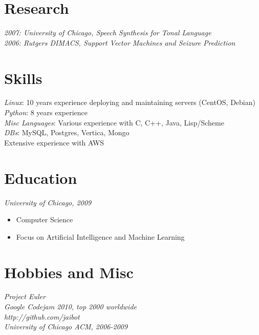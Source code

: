 \documentclass[11pt]{res} %
\begin{document}
\begin{resume}
\section{Research}
{\sl 2007: University of Chicago, Speech Synthesis for Tonal Language} \\
{\sl 2006: Rutgers DIMACS, Support Vector Machines and Seizure Prediction}

\section{Skills}
{\sl Linux}: 10 years experience deploying and maintaining servers (CentOS, Debian)\\
{\sl Python}: 8 years experience \\
{\sl Misc Languages}: Various experience with C, C++, Java, Lisp/Scheme \\
{\sl DBs}: MySQL, Postgres, Vertica, Mongo \\
Extensive experience with AWS


\section{Education}

{\sl University of Chicago, 2009}
\begin{itemize}
    \item Computer Science
    \item Focus on Artificial Intelligence and Machine Learning
\end{itemize}
 

\section{Hobbies and Misc} 

{\it Project Euler} \\
{\it Google Codejam 2010, top 2000 worldwide} \\
{\it http://github.com/jaibot } \\
{\it University of Chicago ACM, 2006-2009} \\



\end{resume}
\end{document}
